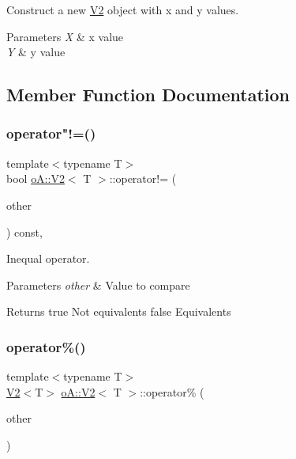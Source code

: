 Construct a new \mbox{\hyperlink{structo_a_1_1_v2}{V2}} object with x and y values. 


\begin{DoxyParams}{Parameters}
{\em X} & x value \\
\hline
{\em Y} & y value \\
\hline
\end{DoxyParams}


\subsection{Member Function Documentation}
\mbox{\label{structo_a_1_1_v2_a5ca601a9f46507dba0e6a78e4e6fb06e}} 
\subsubsection{\texorpdfstring{operator"!=()}{operator!=()}}
{\footnotesize\ttfamily template$<$typename T$>$ \\
bool \mbox{\hyperlink{structo_a_1_1_v2}{o\+A\+::\+V2}}$<$ T $>$\+::operator!= (\begin{DoxyParamCaption}\item[{const \mbox{\hyperlink{structo_a_1_1_v2}{o\+A\+::\+V2}}$<$ T $>$ \&}]{other }\end{DoxyParamCaption}) const\hspace{0.3cm}{\ttfamily [inline]}, {\ttfamily [noexcept]}}



Inequal operator. 


\begin{DoxyParams}{Parameters}
{\em other} & Value to compare \\
\hline
\end{DoxyParams}
\begin{DoxyReturn}{Returns}
true Not equivalents  false Equivalents 
\end{DoxyReturn}
\mbox{\label{structo_a_1_1_v2_a0566d5d8796320c591462eb26ebffdce}} 
\subsubsection{\texorpdfstring{operator\%()}{operator\%()}}
{\footnotesize\ttfamily template$<$typename T$>$ \\
\mbox{\hyperlink{structo_a_1_1_v2}{V2}}$<$T$>$ \mbox{\hyperlink{structo_a_1_1_v2}{o\+A\+::\+V2}}$<$ T $>$\+::operator\% (\begin{DoxyParamCaption}\item[{const \mbox{\hyperlink{structo_a_1_1_v2}{o\+A\+::\+V2}}$<$ T $>$ \&}]{other }\end{DoxyParamCaption})\hspace{0.3cm}{\ttfamily [inline]}}



